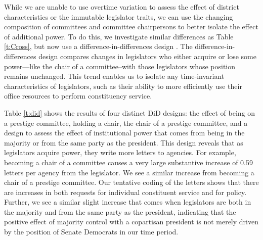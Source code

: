 \documentclass{article}
\begin{document}

While we are unable to use overtime variation to assess the effect of district characteristics or the immutable legislator traits, we can use the changing composition of committees and committee chairpersons to better isolate the effect of additional power.  To do this, we investigate similar differences as Table \ref{t:Cross}, but now use a difference-in-differences design \citep{BerryFowler2016}.  The difference-in-differences design compares changes in legislators who either acquire or lose some power---like the chair of a committee--with those legislators whose position remains unchanged.  This trend enables us to isolate any time-invariant characteristics of legislators, such as their ability to more efficiently use their office resources to perform constituency service. 

Table \ref{t:did} shows the results of four distinct DiD designs: the effect of being on a prestige committee, holding a chair, the chair of a prestige committee, and a design to assess the effect of institutional power that comes from being in the majority or from the same party as the president.  This design reveals that as legislators acquire power, they write more letters to agencies.  For example, becoming a chair of a committee causes a very large substantive increase of 0.59 letters per agency from the legislator.  We see a similar increase from becoming a chair of a prestige committee.  Our tentative coding of the letters shows that there are increases in both requests for individual constituent service and for policy.  Further, we see a similar slight increase that comes when legislators are both in the majority and from the same party as the president, indicating that the positive effect of majority control with a copartisan president is not merely driven by the position of Senate Democrats in our time period. 
\end{document}
